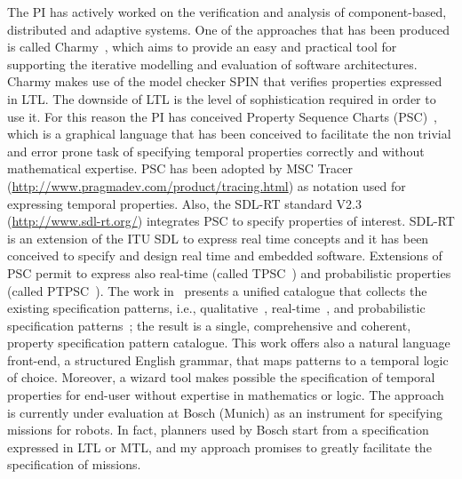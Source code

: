 \documentclass[12pt]{article}
\begin{document}
The PI has actively worked on the verification and analysis of %
component-based, distributed and adaptive systems. 
One of the approaches that has been produced is called Charmy~\cite{Pelliccione2009}, which aims to provide an easy and practical tool for supporting the iterative modelling and evaluation of software architectures. %
Charmy makes use of the model checker SPIN that verifies properties expressed in LTL. The downside of LTL is the level of sophistication required in order to use it. 
For this reason the PI has conceived Property Sequence Charts (PSC)~\cite{AIP07}, which is a graphical language that has been conceived to facilitate the non trivial and error prone task of specifying
temporal properties correctly and without mathematical expertise. 
PSC has been adopted by MSC Tracer ({\small \url{http://www.pragmadev.com/product/tracing.html}}) as notation used for expressing temporal properties. Also, the SDL-RT standard V2.3 ({\small \url{http://www.sdl-rt.org/}}) 
integrates PSC to specify properties of interest. SDL-RT is an extension of the ITU SDL to express real time concepts
and it has been conceived to specify and design real time and embedded software. Extensions of PSC permit to express also real-time (called TPSC~\cite{TPSC}) and probabilistic properties (called PTPSC~\cite{PTPSC}). 
The work in~\cite{TSE2015} presents a unified catalogue that collects the existing specification patterns, i.e., qualitative~\cite{dwyer-99}, real-time~\cite{Konrad2005}, and probabilistic specification patterns~\cite{Grunske2008}; %
the result is a single, comprehensive and coherent, property specification
pattern catalogue. This work offers also a natural language front-end, a structured English grammar, that maps patterns to a temporal logic of choice.
Moreover, a wizard tool makes possible the specification of temporal properties for end-user without expertise in mathematics or logic. The approach is currently under evaluation at Bosch (Munich) as an instrument for specifying missions for robots. In fact, planners used by Bosch start from a specification expressed in LTL or MTL, and my approach promises to greatly facilitate the specification of missions. 
\end{document}
